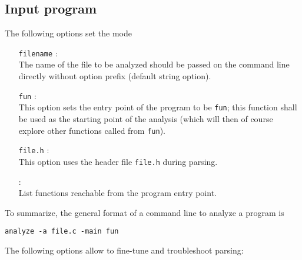 \subsection{Input program}
\label{s:opt:in}
The following options set the mode
\begin{itemize}
\item[\texttt{filename}]: \\
  The name of the file to be analyzed should be passed on the command
  line directly without option prefix (default string option).
\item[\doption{-main} \texttt{fun}]: \\
  This option sets the entry point of the program to be \texttt{fun};
  this function shall be used as the starting point of the analysis
  (which will then of course explore other functions called from
  \texttt{fun}).
\item[\doption{-header} \texttt{file.h}]: \\
  This option uses the header file \texttt{file.h} during parsing.
\item[\doption{-reachable}]: \\
  List functions reachable from the program entry point.
\end{itemize}
To summarize, the general format of a command line to analyze a
program is
\begin{verbatim}
analyze -a file.c -main fun
\end{verbatim}
The following options allow to fine-tune and troubleshoot parsing:
\label{opt:parsing}
